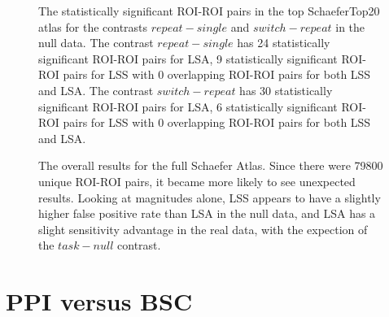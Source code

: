\documentclass[phd,appendix,figures]{uithesis}
\begin{document}
\begin{figure}[H]
  \ContinuedFloat
  \centering


  \caption{
      The statistically significant ROI-ROI pairs in the top SchaeferTop20 atlas
      for the contrasts $repeat - single$ and $switch - repeat$ in the null data.
      The contrast $repeat - single$ has 24 statistically significant ROI-ROI
      pairs for LSA, 9 statistically significant ROI-ROI pairs
      for LSS with 0 overlapping ROI-ROI pairs for both LSS and LSA.
      The contrast $switch - repeat$ has 30 statistically significant ROI-ROI
      pairs for LSA, 6 statistically significant ROI-ROI pairs
      for LSS with 0 overlapping ROI-ROI pairs for both LSS and LSA.
  }
  \label{fig:significant-contrasts5}
\end{figure}

\begin{figure}[H]
  \centering


  \caption{
      The overall results for the full Schaefer Atlas.
      Since there were 79800 unique ROI-ROI pairs, it became more likely
      to see unexpected results.
      Looking at magnitudes alone, LSS appears to have a slightly
      higher false positive rate than LSA in the null data, and 
      LSA has a slight sensitivity advantage in the real data, 
      with the expection of the $task - null$ contrast.
  }
  \label{fig:significant-contrasts6}
\end{figure}

\chapter{PPI versus BSC}
\end{document}
